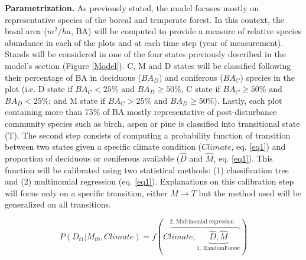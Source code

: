 \textbf{Parametrization.} As previously stated, the model focuses mostly on
representative species of the boreal and temperate forest. In this context,
the basal area ($m^2/ha$, BA) will be computed to provide a measure of relative
species abundance in each of the plots and at each time step (year of
measurement). Stands will be considered in one of the four states previously
described in the model's section (Figure \ref{Model}). C, M and D states will be
classified following their percentage of BA in deciduous ($BA_D$) and coniferous
($BA_C$) species in the plot (i.e. D state if $BA_C < 25\%$ and $BA_D \geq
50\%$, C state if ${BA}_C \geq 50\%$ and $BA_D < 25\%$; and M state if $BA_C >
25\%$ and $BA_D \geq 50\%$). Lastly, each plot containing more than 75\% of BA
mostly representative of post-disturbance community species such as birch,
aspen or pine is classified into transitional state (T). 
%
%
%
%
%
The second step
consists of computing a probability function of transition between two states
given a specific climate condition ($Climate$, eq. \ref{eq1}) and proportion
of deciduous or coniferous available ($\hat{D}$ and $\hat{M}$, eq.
\ref{eq1}). This function will be calibrated using two statistical methods:
(1) classification tree and (2) multinomial regression (eq. \ref{eq1}).
Explanations on this calibration step will focus only on a specific
transition, either $M \rightarrow T$ but the method used will be generalized
on all transitions.

\begin{equation}
	P(D_{t1}|M_{t0}, Climate) = f(\overbrace{Climate, \underbrace{\hat{D}, \hat{M}}_\text{1. RandomForest}}^\text{2. Multinomial regression})
\label{eq1}
\end{equation}


